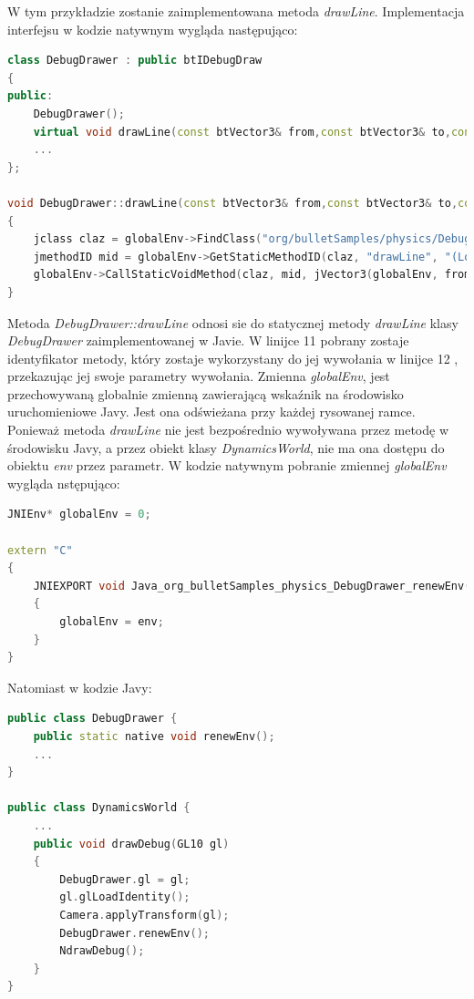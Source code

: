 W tym przykładzie zostanie zaimplementowana metoda \emph{drawLine}.
Implementacja interfejsu w kodzie natywnym wygląda następująco:

\begin{lstlisting}[language=c++, caption=Deklaracja klasy
DebugDrawer,label=lis:debugDrawer_cpp]
class DebugDrawer : public btIDebugDraw
{
public:
	DebugDrawer();
	virtual void drawLine(const btVector3& from,const btVector3& to,const btVector3& color); 
	...
};

void DebugDrawer::drawLine(const btVector3& from,const btVector3& to,const btVector3& fromColor, const btVector3& toColor)
{
	jclass claz = globalEnv->FindClass("org/bulletSamples/physics/DebugDrawer");
	jmethodID mid = globalEnv->GetStaticMethodID(claz, "drawLine", "(Lorg/bulletSamples/geometry/Vector3;Lorg/bulletSamples/geometry/Vector3;Lorg/bulletSamples/geometry/Vector3;Lorg/bulletSamples/geometry/Vector3;)V");
	globalEnv->CallStaticVoidMethod(claz, mid, jVector3(globalEnv, from), jVector3(globalEnv, to), jVector3(globalEnv, fromColor), jVector3(globalEnv, toColor));
}
\end{lstlisting}

Metoda \emph{DebugDrawer::drawLine} odnosi sie do statycznej metody
\emph{drawLine} klasy \emph{DebugDrawer} zaimplementowanej w Javie. W linijce
11 pobrany zostaje identyfikator metody, który zostaje wykorzystany do jej
wywołania w linijce 12 , przekazując jej swoje parametry wywołania. Zmienna
\emph{globalEnv}, jest przechowywaną globalnie zmienną zawierającą wskaźnik na
środowisko uruchomieniowe Javy. Jest ona odświeżana przy każdej rysowanej
ramce. Ponieważ metoda \emph{drawLine} nie jest bezpośrednio wywoływana przez
metodę w środowisku Javy, a przez obiekt klasy \emph{DynamicsWorld}, nie ma ona
dostępu do obiektu \emph{env} przez parametr. W kodzie natywnym pobranie
zmiennej \emph{globalEnv} wygląda nstępująco:

\newpage
\begin{lstlisting}[language=c++, caption=Deklaracja
funkcji renewEnv w kodzie natywnym,label=lis:renewEnvNat]
JNIEnv* globalEnv = 0;

extern "C"
{
	JNIEXPORT void Java_org_bulletSamples_physics_DebugDrawer_renewEnv(JNIEnv* env, jclass claz)
	{
		globalEnv = env;
	}
}
\end{lstlisting}

Natomiast w kodzie Javy:

\begin{lstlisting}[language=c++, caption=Deklaracja
i wykorzystanie metody renewEnv w kodzie Javy,label=lis:renewEnvJav]
public class DebugDrawer {
	public static native void renewEnv();
	...
}

public class DynamicsWorld {
	...
	public void drawDebug(GL10 gl)
	{
		DebugDrawer.gl = gl;
		gl.glLoadIdentity();
		Camera.applyTransform(gl);
		DebugDrawer.renewEnv();
		NdrawDebug();
	}
}
\end{lstlisting}

